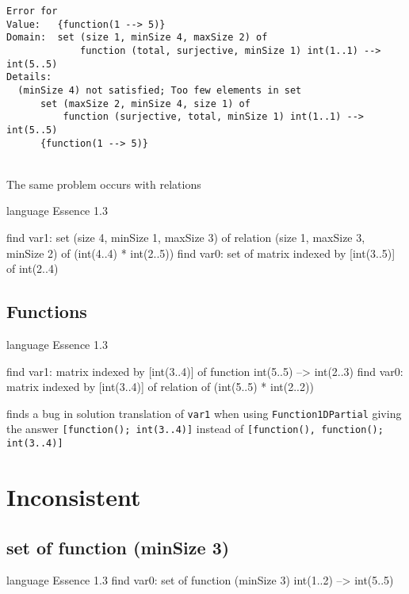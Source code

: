 \begin{lstlisting}[breaklines=true,caption=Validating the solution]
Error for
Value:   {function(1 --> 5)}
Domain:  set (size 1, minSize 4, maxSize 2) of
             function (total, surjective, minSize 1) int(1..1) --> int(5..5)
Details:
  (minSize 4) not satisfied; Too few elements in set
      set (maxSize 2, minSize 4, size 1) of
          function (surjective, total, minSize 1) int(1..1) --> int(5..5)
      {function(1 --> 5)}
\end{lstlisting}


\ \\ The same problem occurs with relations 
\begin{lst:essence}[caption=1406343903.essence]
language Essence 1.3

find var1:
        set (size 4, minSize 1, maxSize 3) of
            relation (size 1, maxSize 3, minSize 2) of (int(4..4) * int(2..5))
find var0: set of matrix indexed by [int(3..5)] of int(2..4)

\end{lst:essence}

\subsection{Functions}

\begin{lst:essence}
language Essence 1.3

find var1: matrix indexed by [int(3..4)] of function int(5..5) --> int(2..3)
find var0: matrix indexed by [int(3..4)] of relation of (int(5..5) * int(2..2))
\end{lst:essence}

finds a bug in solution translation of \texttt{var1} when using \texttt{Function1DPartial}  giving the answer \texttt{[function(); int(3..4)]} instead of \texttt{[function(), function(); int(3..4)]}\\

\section{Inconsistent}

\subsection{ set of function (minSize 3)}

\begin{lst:essence}[caption=1406371130.essence]
language Essence 1.3
find var0: set of function (minSize 3) int(1..2) --> int(5..5)
\end{lst:essence}

